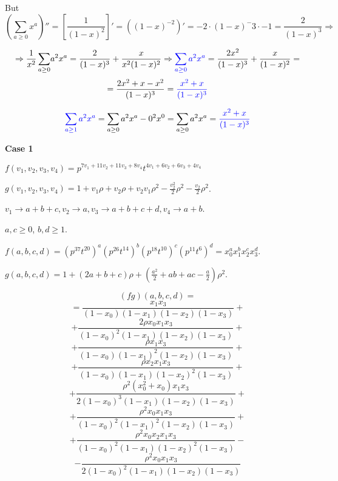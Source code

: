 \documentclass{article}
\begin{document}
But \[(\sum_{a\geq{0}}x^a)''=[\frac{1}{(1-x)^2}]'=((1-x)^{-2})'=-2\cdot(1-x)^-3\cdot-1=\frac{2}{(1-x)^3}\Rightarrow\]

\[\Rightarrow{\frac{1}{x^2}\sum_{a\geq{0}}}a^2x^a=\frac{2}{(1-x)^3}+\frac{x}{x^2(1-x)^2}\Rightarrow{\textcolor{blue}{\sum_{a\geq{0}}a^2x^a}=\frac{2x^2}{(1-x)^3}+\frac{x}{(1-x)^2}}=\]\[=\frac{2x^2+x-x^2}{(1-x)^3}=\textcolor{blue}{\frac{x^2+x}{(1-x)^3}}\]

\[
\textcolor{blue}{\sum_{a\geq{1}}a^2x^a}=\sum_{a\geq{0}}a^2x^a-0^2x^0=\sum_{a\geq{0}}a^2x^a=\textcolor{blue}{\frac{x^2+x}{(1-x)^3}}
\]

\textbf{Case 1}

$f(v_1,v_2,v_3,v_4)=p^{7v_1+11v_2+11v_3+8v_4}t^{4v_1+6v_2+6v_3+4v_4}$

$g(v_1,v_2,v_3,v_4)=1+v_1\rho+v_2\rho+v_2v_1\rho^2-\frac{v_2^2}{2}\rho^2-\frac{v_2}{2}\rho^2$.

$v_1\rightarrow{a+b+c},
v_2\rightarrow{a},
v_3\rightarrow{a+b+c+d},
v_4\rightarrow{a+b}$.

$a,c\geq{0}$, $b,d\geq{1}$.

$f(a,b,c,d)=(p^{37}t^{20})^a(p^{26}t^{14})^b(p^{18}t^{10})^c(p^{11}t^{6})^d=x_0^ax_1^bx_2^cx_3^d$.

$g(a,b,c,d)=1+(2a+b+c)\rho+(\frac{a^2}{2}+ab+ac-\frac{a}{2})\rho^2$.

\[(fg)(a,b,c,d)=\]\[=
\frac{x_1x_3}{(1-x_0)(1-x_1)(1-x_2)(1-x_3)}+\]
\[+\frac{2\rho{x_0}x_1x_3}{(1-x_0)^2(1-x_1)(1-x_2)(1-x_3)}+
\]
\[+\frac{\rho{x_1}x_3}{(1-x_0)(1-x_1)^2(1-x_2)(1-x_3)}+
\]
\[+\frac{\rho{x_2}x_1x_3}{(1-x_0)(1-x_1)(1-x_2)^2(1-x_3)}+
\]
\[+\frac{\rho^2(x_0^2+x_0)x_1x_3}{2(1-x_0)^3(1-x_1)(1-x_2)(1-x_3)}+
\]
\[+\frac{\rho^2x_0x_1x_3}{(1-x_0)^2(1-x_1)^2(1-x_2)(1-x_3)}+
\]
\[+\frac{\rho^2x_0x_2x_1x_3}{(1-x_0)^2(1-x_1)(1-x_2)^2(1-x_3)}-
\]
\[-\frac{\rho^2x_0x_1x_3}{2(1-x_0)^2(1-x_1)(1-x_2)(1-x_3)}
\]
\end{document}
